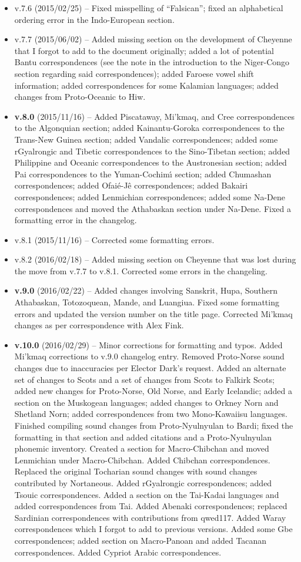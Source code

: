 \documentclass[11pt]{article}
\begin{document}
\begin{itemize}
\item v.7.6 (2015/02/25) -- Fixed misspelling of ``Falsican''; fixed an alphabetical ordering 
error in the Indo-European section.
\item v.7.7 (2015/06/02) -- Added missing section on the development of Cheyenne that I forgot to add to the document originally; added a lot of potential Bantu correspondences (see the note in the introduction to the Niger-Congo section regarding said correspondences); added Faroese vowel shift information; added correspondences for some Kalamian languages; added changes from Proto-Oceanic to Hiw.
\item {\bf v.8.0} (2015/11/16) -- Added Piscataway, Mi'kmaq, and Cree correspondences to the Algonquian section; added Kainantu-Goroka correspondences to the Trans-New Guinea section; added Vandalic correspondences; added some rGyalrongic and Tibetic correspondences to the Sino-Tibetan section; added Philippine and Oceanic correspondences to the Austronesian section; added Pai correspondences to the Yuman-Cochim\'{\i} section; added Chumashan correspondences; added Ofai\'{e}-J\^{e} correspondences; added Bakairi correspondences; added Lenmichian correspondences; added some Na-Dene correspondences and moved the Athabaskan section under Na-Dene. Fixed a formatting error in the changelog.
\item v.8.1 (2015/11/16) -- Corrected some formatting errors.
\item v.8.2 (2016/02/18) -- Added missing section on Cheyenne that was lost during the move from v.7.7 to v.8.1. Corrected some errors in the changeling.
\item {\bf v.9.0} (2016/02/22) -- Added changes involving Sanskrit, Hupa, Southern Athabaskan, Totozoquean, Mande, and Luangiua. Fixed some formatting errors and updated the version number on the title page. Corrected Mi'kmaq changes as per correspondence with Alex Fink.
\item {\bf v.10.0} (2016/02/29) -- Minor corrections for formatting and typos. Added Mi'kmaq corrections to v.9.0 changelog entry. Removed Proto-Norse sound changes due to inaccuracies per Elector Dark's request. Added an alternate set of changes to Scots and a set of changes from Scots to Falkirk Scots; added new changes for Proto-Norse, Old Norse, and Early Icelandic; added a section on the Muskogean languages; added changes to Orkney Norn and Shetland Norn; added correspondences from two Mono-Kawaiisu languages. Finished compiling sound changes from Proto-Nyulnyulan to Bardi; fixed the formatting in that section and added citations and a Proto-Nyulnyulan phonemic inventory. Created a section for Macro-Chibchan and moved Lenmichian under Macro-Chibchan. Added Chibchan correspondences. Replaced the original Tocharian sound changes with sound changes contributed by Nortaneous. Added rGyalrongic correspondences; added Tsouic correspondences. Added a section on the Tai-Kadai languages and added correspondences from Tai. Added Abenaki correspondences; replaced Sardinian correspondences with contributions from qwed117. Added Waray correspondences which I forgot to add to previous versions. Added some Gbe correspondences; added section on Macro-Panoan and added Tacanan correspondences. Added Cypriot Arabic correspondences.

\end{itemize}
\end{document}
